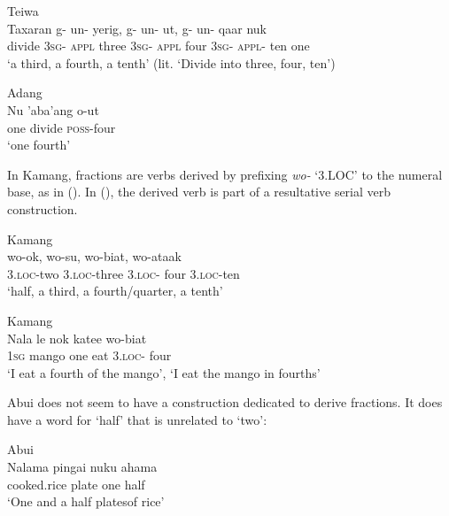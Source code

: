 \ea%
\label{bkm:Ref342746583}
Teiwa\\
\gll  Taxaran  g-  un-  yerig,  g-  un-  ut,  g-  un-  qaar nuk \\
   divide  \textsc{3sg}-  \textsc{appl} three  \textsc{3sg-}  \textsc{appl} four  \textsc{3sg-}  \textsc{appl-} ten one   \\
\glt  `a third, a fourth, a tenth' (lit. `Divide into three, four, ten')
\z








\ea
Adang\\
\gll Nu  'aba'ang  o-ut\\
  one  divide  \textsc{poss}{}-four\\
\glt `one fourth'
\z



In Kamang, fractions are verbs derived by prefixing \textit{wo-} `3.LOC' to the numeral base, as in (). In (), the derived verb is part of a resultative serial verb construction.


\ea%
\label{bkm:Ref342746224}
Kamang\\
\gll wo-ok,    wo-su,  wo-biat,  wo-ataak     \\
   3.\textsc{loc-}two    3.\textsc{loc-}three  3.\textsc{loc-} four  3.\textsc{loc-}ten   \\
\glt `half, a third, a fourth/quarter, a tenth'
\z








\ea%
\label{bkm:Ref342746258}
Kamang\\
\gll  Nala  le  nok  katee  wo-biat  \\
   \textsc{1sg } mango  one  eat  3.\textsc{loc-} four    \\
\glt `I eat a fourth of the mango', `I eat the mango in fourths'
\z







Abui does not seem to have a construction dedicated to derive fractions. It does have a word for `half' that is unrelated to `two':


\ea
Abui\\
 \gll   Nalama  pingai  nuku  ahama   \\
    cooked.rice  plate  one  half   \\
 \glt  `One and a half platesof rice'
\z







